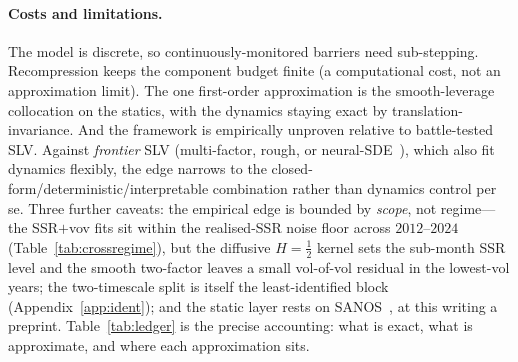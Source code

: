 \documentclass[11pt]{article}
\begin{document}
\paragraph{Costs and limitations.} The model is discrete, so continuously-monitored barriers need
sub-stepping. Recompression keeps the component budget finite (a computational cost, not an
approximation limit). The one first-order approximation is the smooth-leverage collocation on
the statics, with the dynamics staying exact by translation-invariance. And the framework is
empirically unproven relative to battle-tested SLV. Against \emph{frontier}
SLV (multi-factor, rough, or neural-SDE~\cite{cuchiero2020}), which also fit dynamics
flexibly, the edge narrows to the closed-form/deterministic/interpretable combination
rather than dynamics control per se. Three further caveats: the empirical edge is
bounded by \emph{scope}, not regime---the SSR$+$vov fits sit within the realised-SSR noise floor across
$2012$--$2024$ (Table~\ref{tab:crossregime}), but the diffusive $H{=}\tfrac12$ kernel sets the sub-month SSR
level and the smooth two-factor leaves a small vol-of-vol residual in the lowest-vol years; the two-timescale split is
itself the least-identified block (Appendix~\ref{app:ident}); and the static layer rests on
SANOS~\cite{buehler2026sanos}, at this writing a preprint. Table~\ref{tab:ledger} is the precise accounting: what is
exact, what is approximate, and where each approximation sits.
\end{document}
